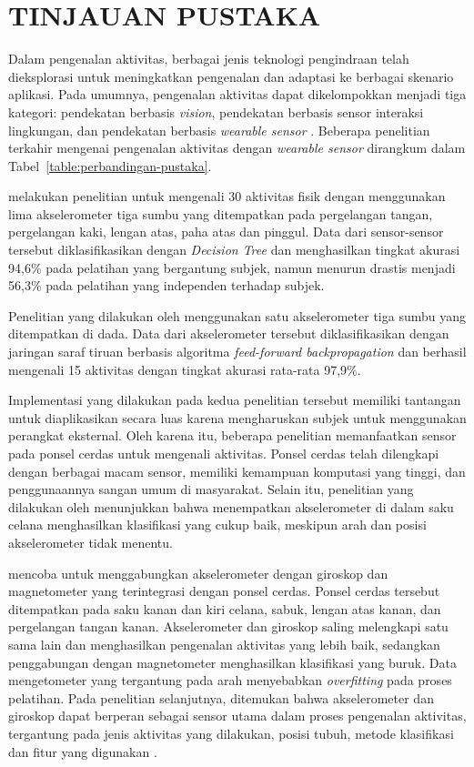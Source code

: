 \chapter{TINJAUAN PUSTAKA}

Dalam pengenalan aktivitas, berbagai jenis teknologi pengindraan telah dieksplorasi untuk meningkatkan pengenalan dan adaptasi ke berbagai skenario aplikasi. Pada umumnya, pengenalan aktivitas dapat dikelompokkan menjadi tiga kategori: pendekatan berbasis \textit{vision}, pendekatan berbasis sensor interaksi lingkungan, dan pendekatan berbasis \textit{wearable sensor} \citep{wang-2016}. Beberapa penelitian terkahir mengenai pengenalan aktivitas dengan \textit{wearable sensor} dirangkum dalam Tabel~\ref{table:perbandingan-pustaka}.

\citet{tapia-2007} melakukan penelitian untuk mengenali 30 aktivitas fisik dengan menggunakan lima akselerometer tiga sumbu yang ditempatkan pada pergelangan tangan, pergelangan kaki, lengan atas, paha atas dan pinggul. Data dari sensor-sensor tersebut diklasifikasikan dengan \textit{Decision Tree} dan menghasilkan tingkat akurasi 94,6\% pada pelatihan yang bergantung subjek, namun menurun drastis menjadi 56,3\% pada pelatihan yang independen terhadap subjek.

Penelitian yang dilakukan oleh \citet{khan-2010} menggunakan satu akselerometer tiga sumbu yang ditempatkan di dada. Data dari akselerometer tersebut diklasifikasikan dengan jaringan saraf tiruan berbasis algoritma \textit{feed-forward backpropagation} dan berhasil mengenali 15 aktivitas dengan tingkat akurasi rata-rata 97,9\%.

Implementasi yang dilakukan pada kedua penelitian tersebut memiliki tantangan untuk diaplikasikan secara luas karena mengharuskan subjek untuk menggunakan perangkat eksternal. Oleh karena itu, beberapa penelitian memanfaatkan sensor pada ponsel cerdas untuk mengenali aktivitas. Ponsel cerdas telah dilengkapi dengan berbagai macam sensor, memiliki kemampuan komputasi yang tinggi, dan penggunaannya sangan umum di masyarakat. Selain itu, penelitian yang dilakukan oleh \citet{he-2008} menunjukkan bahwa menempatkan akselerometer di dalam saku celana menghasilkan klasifikasi yang cukup baik, meskipun arah dan posisi akselerometer tidak menentu.

\citet{shoaib-2013} mencoba untuk menggabungkan akselerometer dengan giroskop dan magnetometer yang terintegrasi dengan ponsel cerdas. Ponsel cerdas tersebut ditempatkan pada saku kanan dan kiri celana, sabuk, lengan atas kanan, dan pergelangan tangan kanan. Akselerometer dan giroskop saling melengkapi satu sama lain dan menghasilkan pengenalan aktivitas yang lebih baik, sedangkan penggabungan dengan magnetometer menghasilkan klasifikasi yang buruk. Data mengetometer yang tergantung pada arah menyebabkan \textit{overfitting} pada proses pelatihan. Pada penelitian selanjutnya, ditemukan bahwa akselerometer dan giroskop dapat berperan sebagai sensor utama dalam proses pengenalan aktivitas, tergantung pada jenis aktivitas yang dilakukan, posisi tubuh, metode klasifikasi dan fitur yang digunakan \citep{shoaib-2014}.

